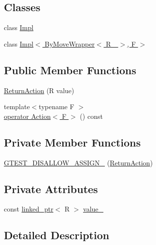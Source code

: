 \subsection*{Classes}
\begin{DoxyCompactItemize}
\item 
class \hyperlink{classtesting_1_1internal_1_1ReturnAction_1_1Impl}{Impl}
\item 
class \hyperlink{classtesting_1_1internal_1_1ReturnAction_1_1Impl_3_01ByMoveWrapper_3_01R___01_4_00_01F_01_4}{Impl$<$ By\+Move\+Wrapper$<$ R\+\_\+ $>$, F $>$}
\end{DoxyCompactItemize}
\subsection*{Public Member Functions}
\begin{DoxyCompactItemize}
\item 
\hyperlink{classtesting_1_1internal_1_1ReturnAction_af65344e503dae3ab36b4fd6d1ede6fb7}{Return\+Action} (R value)
\item 
{\footnotesize template$<$typename F $>$ }\\\hyperlink{classtesting_1_1internal_1_1ReturnAction_a1aab69c4ea104e76e70ba209763f61d5}{operator Action$<$ F $>$} () const
\end{DoxyCompactItemize}
\subsection*{Private Member Functions}
\begin{DoxyCompactItemize}
\item 
\hyperlink{classtesting_1_1internal_1_1ReturnAction_a213aa7089e1caf147a736aa283789045}{G\+T\+E\+S\+T\+\_\+\+D\+I\+S\+A\+L\+L\+O\+W\+\_\+\+A\+S\+S\+I\+G\+N\+\_\+} (\hyperlink{classtesting_1_1internal_1_1ReturnAction}{Return\+Action})
\end{DoxyCompactItemize}
\subsection*{Private Attributes}
\begin{DoxyCompactItemize}
\item 
const \hyperlink{classtesting_1_1internal_1_1linked__ptr}{linked\+\_\+ptr}$<$ R $>$ \hyperlink{classtesting_1_1internal_1_1ReturnAction_a321f509b255d1651234f53e8b064d98d}{value\+\_\+}
\end{DoxyCompactItemize}


\subsection{Detailed Description}

